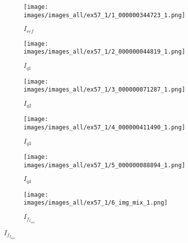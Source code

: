 \begin{figure}[h!]
     \centering
     \begin{subfigure}[b]{0.135\textwidth}
         \centering
         \caption*{$I_{ref}$}
         \texttt{[image: images/images\_all/ex57\_1/1\_000000344723\_1.png]}
         \label{fig:mixed_scene_ex_1_1}
     \end{subfigure}  
     \hfill
     \begin{subfigure}[b]{0.135\textwidth}
         \centering
         \caption*{$I_{q1}$}
         \texttt{[image: images/images\_all/ex57\_1/2\_000000044819\_1.png]}
         \label{fig:mixed_scene_ex_1_2}
     \end{subfigure}  
     \hfill
     \begin{subfigure}[b]{0.135\textwidth}
         \centering
         \caption*{$I_{q2}$}
         \texttt{[image: images/images\_all/ex57\_1/3\_000000071287\_1.png]}
         \label{fig:mixed_scene_ex_1_3}
     \end{subfigure}  
     \hfill
     \begin{subfigure}[b]{0.135\textwidth}
         \centering
         \caption*{$I_{q3}$}
         \texttt{[image: images/images\_all/ex57\_1/4\_000000411490\_1.png]}
         \label{fig:mixed_scene_ex_1_4}
     \end{subfigure}  
     \hfill
     \begin{subfigure}[b]{0.135\textwidth}
         \centering
         \caption*{$I_{q4}$}
         \texttt{[image: images/images\_all/ex57\_1/5\_000000088894\_1.png]}
         \label{fig:mixed_scene_ex_1_5}
     \end{subfigure}  
     \hfill
     \begin{subfigure}[b]{0.135\textwidth}
         \centering
         \caption*{$I_{f_{I_{mix}}}$}
         \texttt{[image: images/images\_all/ex57\_1/6\_img\_mix\_1.png]}
         \label{fig:mixed_scene_ex_1_6}
     \end{subfigure}  
     \hfill

\end{figure}
